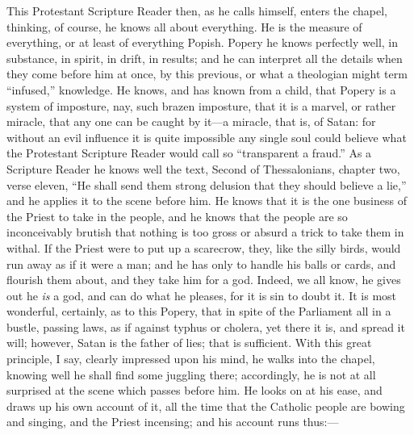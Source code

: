 This Protestant Scripture Reader then, as he calls
himself, enters the chapel, thinking, of course, he knows
all about everything. He is the measure of everything, or
at least of everything Popish. Popery he knows perfectly
well, in substance, in spirit, in drift, in results; and
he can interpret all the details when they come before
him at once, by this previous, or what a theologian might
term ``infused,'' knowledge. He knows, and has
known from a child, that Popery is a system of imposture,
nay, such brazen imposture, that it is a marvel, or
rather miracle, that any one can be caught by it—a
miracle, that is, of Satan: for without an evil influence
it is quite impossible any single soul could believe what
the Protestant Scripture Reader would call so
``transparent a fraud.'' As a Scripture Reader he
knows well the text, Second of Thessalonians, chapter
two, verse eleven, ``He shall send them strong
delusion that they should believe a lie,'' and he
applies it to the scene before him. He knows that it is
the one business of the Priest to take in the people, and
he knows that the people are so inconceivably brutish
that nothing is too gross or absurd a trick to take them
in withal. If the Priest were to put up a scarecrow,
they, like the silly birds, would run away as if it were
a man; and he has only to handle his balls or cards, and
flourish them about, and they take him for a god. Indeed,
we all know, he gives out he \emph{is} a god, and can
do what he pleases, for it is sin to doubt it. It is most
wonderful, certainly, as to this Popery, that in spite of
the Parliament all in a bustle, passing laws, as if
against typhus or cholera, yet there it is, and spread it
will; however, Satan is the father of lies; that is
sufficient. With this great principle, I say, clearly
impressed upon his mind, he walks into the chapel,
knowing well he shall find some juggling there;
accordingly, he is not at all surprised at the scene
which passes before him. He looks on at his ease, and
draws up his own account of it, all the time that the
Catholic people are bowing and singing, and the Priest
incensing; and his account runs thus:—

